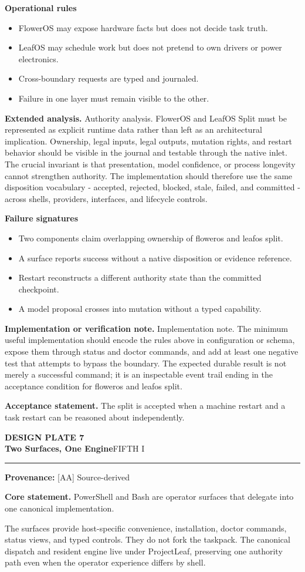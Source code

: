 \documentclass[10pt,letterpaper,oneside]{article}
\newcommand{\prov}[1]{\textcolor{gardenBlue}{\sffamily\footnotesize\textbf{Provenance:} #1}}
\newcommand{\platetitle}[3]{%
  \begin{minipage}[t][0.54in][t]{\textwidth}
  {\sffamily\bfseries\color{gardenDeep}\fontsize{9}{10}\selectfont DESIGN PLATE #1}\\[-1pt]
  {\sffamily\bfseries\color{gardenInk}\fontsize{16.5}{18}\selectfont #2}\hfill{\sffamily\color{gardenGreen}\large #3}
  \end{minipage}\vspace{-2pt}\hrule\vspace{5pt}}
\begin{document}
\textbf{Operational rules}
\begin{itemize}
\item FlowerOS may expose hardware facts but does not decide task truth.
\item LeafOS may schedule work but does not pretend to own drivers or power electronics.
\item Cross-boundary requests are typed and journaled.
\item Failure in one layer must remain visible to the other.
\end{itemize}
\textbf{Extended analysis.} Authority analysis. FlowerOS and LeafOS Split must be represented as explicit runtime data rather than left as an architectural implication. Ownership, legal inputs, legal outputs, mutation rights, and restart behavior should be visible in the journal and testable through the native inlet. The crucial invariant is that presentation, model confidence, or process longevity cannot strengthen authority. The implementation should therefore use the same disposition vocabulary - accepted, rejected, blocked, stale, failed, and committed - across shells, providers, interfaces, and lifecycle controls.

\textbf{Failure signatures}
\begin{itemize}
\item Two components claim overlapping ownership of floweros and leafos split.
\item A surface reports success without a native disposition or evidence reference.
\item Restart reconstructs a different authority state than the committed checkpoint.
\item A model proposal crosses into mutation without a typed capability.
\end{itemize}
\textbf{Implementation or verification note.} Implementation note. The minimum useful implementation should encode the rules above in configuration or schema, expose them through status and doctor commands, and add at least one negative test that attempts to bypass the boundary. The expected durable result is not merely a successful command; it is an inspectable event trail ending in the acceptance condition for floweros and leafos split.

\begin{acceptbox}
\textbf{Acceptance statement.} The split is accepted when a machine restart and a task restart can be reasoned about independently.
\end{acceptbox}
\newpage
\platetitle{7}{Two Surfaces, One Engine}{FIFTH I}
\prov{[AA] Source-derived}
\fontsize{8.85}{10.45}\selectfont
\begin{corebox}
\textbf{Core statement.} PowerShell and Bash are operator surfaces that delegate into one canonical implementation.
\end{corebox}
The surfaces provide host-specific convenience, installation, doctor commands, status views, and typed controls. They do not fork the taskpack. The canonical dispatch and resident engine live under ProjectLeaf, preserving one authority path even when the operator experience differs by shell.
\end{document}
